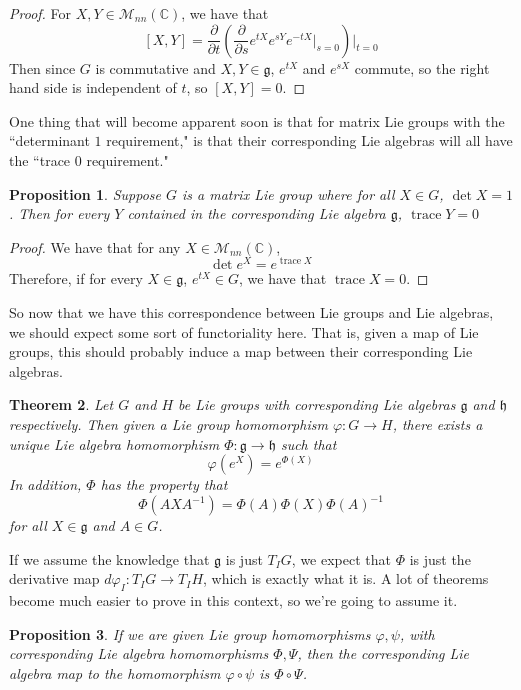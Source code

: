 \documentclass[psamsfonts]{amsart}
\newtheorem{thm}{Theorem}[section]
\newtheorem{prop}[thm]{Proposition}
\theoremstyle{definition}
\theoremstyle{remark}
\newcommand{\C}{\mathbb{C}}
\newcommand{\M}{\mathcal{M}}
\newcommand{\g}{\mathfrak{g}}
\newcommand{\inv}{^{-1}}
\newcommand{\bra}[2]{ \left[ #1, #2 \right] }
\newcommand{\bd}{\partial}
\DeclareMathOperator{\trace}{trace}
\begin{document}
\begin{proof}
For $X,Y \in \M_{nn}(\C)$, we have that 
$$\bra{X}{Y} = \frac{\bd}{\bd t}\left(\frac{\bd }{\bd s}e^{tX}e^{sY}e^{-tX}\bigg\vert_{s = 0}  \right)\bigg\vert_{t=0} $$
Then since $G$ is commutative and $X,Y \in \g$, $e^{tX}$ and $e^{sX}$ commute, so the right hand side is independent of $t$, so $\bra{X}{Y} = 0$.
\end{proof}

One thing that will become apparent soon is that for matrix Lie groups with the ``determinant $1$ requirement," is that their corresponding Lie algebras will all have the ``trace $0$ requirement."

\begin{prop}
Suppose $G$ is a matrix Lie group where for all $X \in G$, $\det X = 1$. Then for every $Y$ contained in the corresponding Lie algebra $\g$, $\trace Y = 0$ 
\end{prop}

\begin{proof}
We have that for any $X \in \M_{nn}(\C)$, 
$$\det e^X = e^{\trace X} $$
Therefore, if for every $X \in \g$, $e^{tX} \in G$, we have that $\trace X = 0$.
\end{proof}

So now that we have this correspondence between Lie groups and Lie algebras, we should expect some sort of functoriality here. That is, given a map of Lie groups, this should probably induce a map between their corresponding Lie algebras. 

\begin{thm}
Let $G$ and $H$ be Lie groups with corresponding Lie algebras $\g$ and $\mathfrak{h}$ respectively. Then given a Lie group homomorphism $\varphi: G \to H$, there exists a unique Lie algebra homomorphism $\Phi: \g \to \mathfrak{h}$ such that 
$$\varphi(e^X) = e^{\Phi(X)} $$
In addition, $\Phi$ has the property that 
$$\Phi(AXA\inv) = \Phi(A)\Phi(X)\Phi(A)\inv $$
for all $X \in \g$ and $A \in G$.
\end{thm}

If we assume the knowledge that $\g$ is just $T_{I}G$, we expect that $\Phi$ is just the derivative map $d\varphi_I: T_IG \to T_IH$, which is exactly what it is. A lot of theorems become much easier to prove in this context, so we're going to assume it.

\begin{prop}
If we are given Lie group homomorphisms $\varphi, \psi$, with corresponding Lie algebra homomorphisms $\Phi, \Psi$, then the corresponding Lie algebra map to the homomorphism $\varphi \circ \psi$ is $\Phi \circ \Psi$.
\end{prop}
\end{document}
